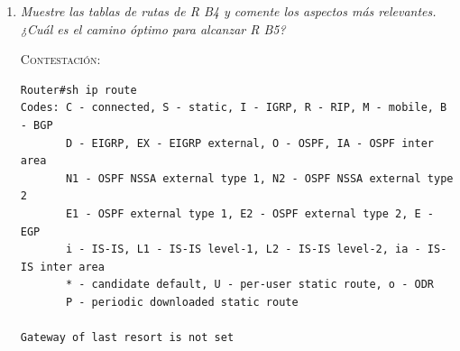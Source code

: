 \documentclass[11pt]{article}
\begin{document}
\begin{enumerate}
\begin{mdframed}
\begin{verbatim}
     171.84.0.0/16 is variably subnetted, 11 subnets, 4 masks
O IA    171.84.16.0/25 [110/129] via 171.84.17.85, 00:01:49, Serial2/0
O IA    171.84.16.128/26 [110/65] via 171.84.17.85, 00:01:49, Serial2/0
O IA    171.84.16.192/26 [110/66] via 171.84.17.85, 00:01:49, Serial2/0
C       171.84.17.0/26 is directly connected, FastEthernet0/0
O       171.84.17.64/28 [110/65] via 171.84.17.89, 00:02:15, Serial3/0
O       171.84.17.80/30 [110/128] via 171.84.17.85, 00:01:49, Serial2/0
                        [110/128] via 171.84.17.89, 00:01:49, Serial3/0
C       171.84.17.84/30 is directly connected, Serial2/0
C       171.84.17.88/30 is directly connected, Serial3/0
O IA    171.84.17.128/30 [110/192] via 171.84.17.85, 00:01:49, Serial2/0
O IA    171.84.17.132/30 [110/128] via 171.84.17.85, 00:01:49, Serial2/0
O IA    171.84.17.136/30 [110/128] via 171.84.17.85, 00:01:49, Serial2/0
O*IA 0.0.0.0/0 [110/65] via 171.84.17.85, 00:01:49, Serial2/0
\end{verbatim}
\end{mdframed}

$\hfill\square$

\vspace{12px}

\item \textit{Muestre las tablas de rutas de R B4 y comente los aspectos más
relevantes. ¿Cuál es el camino óptimo para alcanzar R B5?}

\vspace{7px}

\textsc{Contestación}:

\begin{mdframed}
\begin{verbatim}
Router#sh ip route 
Codes: C - connected, S - static, I - IGRP, R - RIP, M - mobile, B - BGP
       D - EIGRP, EX - EIGRP external, O - OSPF, IA - OSPF inter area
       N1 - OSPF NSSA external type 1, N2 - OSPF NSSA external type 2
       E1 - OSPF external type 1, E2 - OSPF external type 2, E - EGP
       i - IS-IS, L1 - IS-IS level-1, L2 - IS-IS level-2, ia - IS-IS inter area
       * - candidate default, U - per-user static route, o - ODR
       P - periodic downloaded static route

Gateway of last resort is not set


\end{verbatim}
\end{mdframed}
\end{enumerate}
\end{document}
